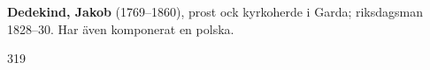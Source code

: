 \textbf{Dedekind, Jakob} (1769--1860), prost ock kyrkoherde i Garda; riksdagsman 1828--30\@. Har även komponerat en polska.

319 
